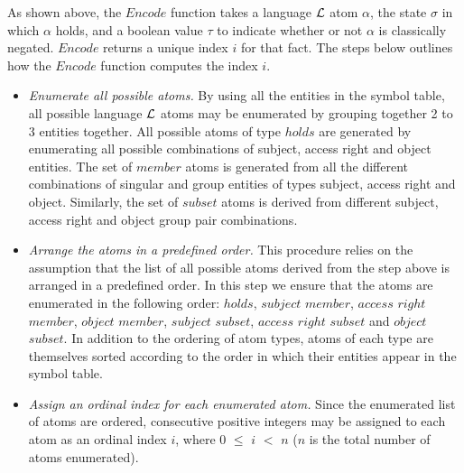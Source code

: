 \documentclass[11pt]{report}
\begin{document}
          As shown above, the $Encode$ function takes a language ${\cal L}$
          atom $\alpha$, the state $\sigma$ in which $\alpha$ holds, and a
          boolean value $\tau$ to indicate whether or not $\alpha$ is
          classically negated. $Encode$ returns a unique index $i$ for that
          fact. The steps below outlines how the $Encode$ function computes
          the index $i$.

          \begin{itemize}
            \item
              {\em Enumerate all possible atoms.}
              By using all the entities in the symbol table, all possible
              language ${\cal L}$ atoms may be enumerated by grouping together
              2 to 3 entities together. All possible atoms of type $holds$ are
              generated by enumerating all possible combinations of subject,
              access right and object entities. The set of $member$ atoms is
              generated from all the different combinations of singular and
              group entities of types subject, access right and object.
              Similarly, the set of $subset$ atoms is derived from different
              subject, access right and object group pair combinations.

            \item
              {\em Arrange the atoms in a predefined order.}
              This procedure relies on the assumption that the list of all
              possible atoms derived from the step above is arranged in a
              predefined order. In this step we ensure that the atoms are
              enumerated in the following order: $holds$, $subject$ $member$,
              $access$ $right$ $member$, $object$ $member$, $subject$
              $subset$, $access$ $right$ $subset$ and $object$ $subset$. In
              addition to the ordering of atom types, atoms of each type are
              themselves sorted according to the order in which their entities
              appear in the symbol table.

            \item
              {\em Assign an ordinal index for each enumerated atom.}
              Since the enumerated list of atoms are ordered, consecutive
              positive integers may be assigned to each atom as an ordinal
              index $i$, where $0$ $\leq$ $i$ $<$ $n$ ($n$ is the total number
              of atoms enumerated).


\end{itemize}
\end{document}
